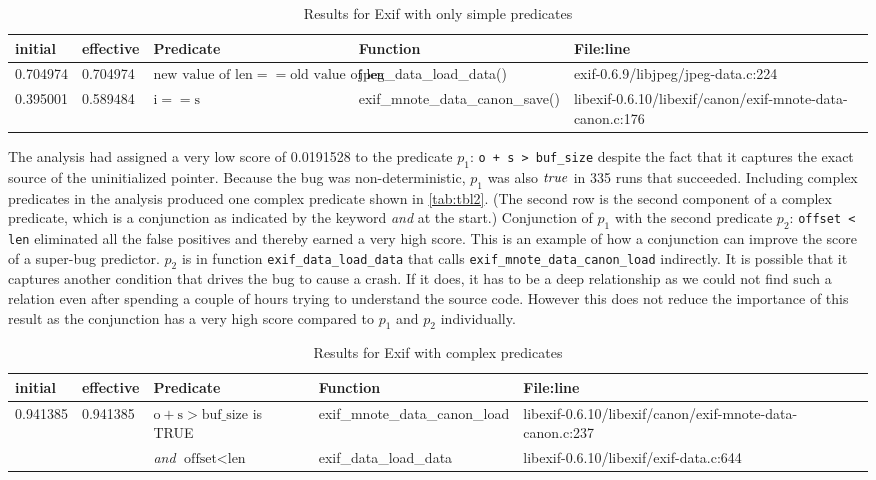 \begin{table*}
\caption{Results for Exif with only simple predicates}
\label{tab:tbl1}
\centering
\scriptsize
\begin{tabular}{lllll}
\toprule
initial & effective & Predicate & Function & File:line \\
\midrule
0.704974 & 0.704974 & $\text{new value of len} == \text{old value of len}$ & jpeg\_data\_load\_data() & exif-0.6.9/libjpeg/jpeg-data.c:224 \\
0.395001 & 0.589484 & $\text{i} == \text{s}$ & exif\_mnote\_data\_canon\_save() & libexif-0.6.10/libexif/canon/exif-mnote-data-canon.c:176 \\
\bottomrule
\end{tabular}
\end{table*}

The analysis had assigned a very low score of 0.0191528 to the predicate $p_1$: \texttt{o + s > buf\_size} despite the fact that it captures the exact source of the uninitialized pointer.  Because the bug was non-deterministic, $p_1$ was also $\mathit{true}$ in 335 runs that succeeded.  Including complex predicates in the analysis produced one complex predicate shown in \autoref{tab:tbl2}.  (The second row is the second component of a complex predicate, which is a conjunction as indicated by the keyword \emph{and} at the start.)  Conjunction of $p_1$ with the second predicate $p_2$: \texttt{offset < len} eliminated all the false positives and thereby earned a very high score.  This is an example of how a conjunction can improve the score of a super-bug predictor.  $p_2$ is in function \texttt{exif\_data\_load\_data} that calls \texttt{exif\_mnote\_data\_canon\_load} indirectly.  It is possible that it captures another condition that drives the bug to cause a crash.  If it does, it has to be a deep relationship as we could not find such a relation even after spending a couple of hours trying to understand the source code.  However this does not reduce the importance of this result as the conjunction has a very high score compared to $p_1$ and $p_2$ individually.

\begin{table*}
\caption{Results for Exif with complex predicates}
\label{tab:tbl2}
\centering
\scriptsize
\begin{tabular}{lllll}
\toprule
initial & effective & Predicate & Function & File:line \\
\midrule
0.941385 & 0.941385 & $\text{o} + \text{s} > \text{buf\_size}$ is TRUE & exif\_mnote\_data\_canon\_load &
 libexif-0.6.10/libexif/canon/exif-mnote-data-canon.c:237 \\

         &          & \emph{and} $\text{offset} < \text{len}$ & exif\_data\_load\_data & libexif-0.6.10/libexif/exif-data.c:644 \\
\bottomrule
\end{tabular}
\end{table*}

